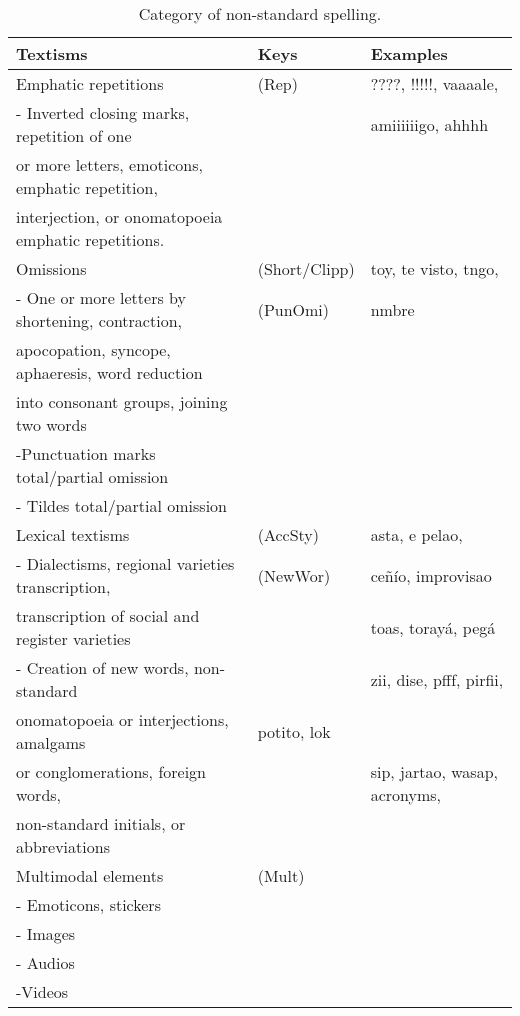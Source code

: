 \documentclass{textolivre}
\begin{document}
\begin{table}[htpb]
\caption{Category of non-standard spelling.}
\label{tbl-tabela-01}
\small
\centering
\begin{tabular}{llp{4.3cm}}
\toprule 
Textisms                      & Keys                       & Examples\\ 
\midrule
Emphatic repetitions                 & (Rep)                & ????, !!!!!, vaaaale, \\
- Inverted closing marks, repetition of one & & amiiiiiigo, ahhhh\\
or more letters, emoticons, emphatic repetition, \\
interjection, or onomatopoeia emphatic repetitions.\\
Omissions & (Short/Clipp) & toy, te visto, tngo, \\
- One or more letters by shortening, contraction, & (PunOmi) & nmbre\\
apocopation, syncope, aphaeresis, word reduction \\
into consonant groups, joining two words\\
 -Punctuation marks total/partial omission \\
 - Tildes total/partial omission\\
 Lexical textisms & (AccSty) & asta, e pelao,\\
 - Dialectisms, regional varieties transcription, & (NewWor) & ceñío, improvisao\\
 transcription of social and register varieties & & toas, torayá, pegá\\
 - Creation of new words, non-standard  & & zii, dise, pfff, pirfii,\\
 onomatopoeia or interjections, amalgams  & potito, lok \\
 or conglomerations, foreign words, & & sip, jartao, wasap, acronyms,\\
 non-standard initials, or abbreviations & \\
 Multimodal elements & (Mult)\\
 - Emoticons, stickers\\
 - Images\\
 - Audios\\
 -Videos\\
\bottomrule
\end{tabular}
\end{table}
\end{document}
